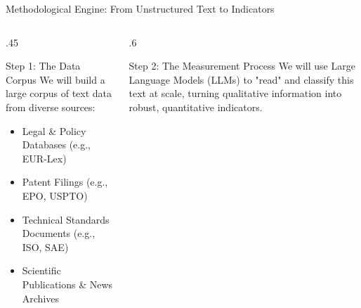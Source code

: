 \documentclass[10pt, aspectratio=169]{beamer}
\begin{document}
\begin{frame}{Methodological Engine: From Unstructured Text to Indicators}
    \begin{columns}[T]
        \begin{column}{.45\textwidth}
            \begin{block}{\textcolor{aauDarkBlue}{Step 1: The Data Corpus}}
                We will build a large corpus of text data from diverse sources:
                \begin{itemize}
                    \item Legal \& Policy Databases (e.g., EUR-Lex)
                    \item Patent Filings (e.g., EPO, USPTO)
                    \item Technical Standards Documents (e.g., ISO, SAE)
                    \item Scientific Publications & News Archives
                \end{itemize}
            \end{block}
        \end{column}
        
        \begin{column}{.6\textwidth}
            \begin{block}{\textcolor{aauDarkOrange}{Step 2: The Measurement Process}}
                We will use Large Language Models (LLMs) to "read" and classify this text at scale, turning qualitative information into robust, quantitative indicators.
                
            \end{block}
        \end{column}
    \end{columns}
\end{frame}
\end{document}
